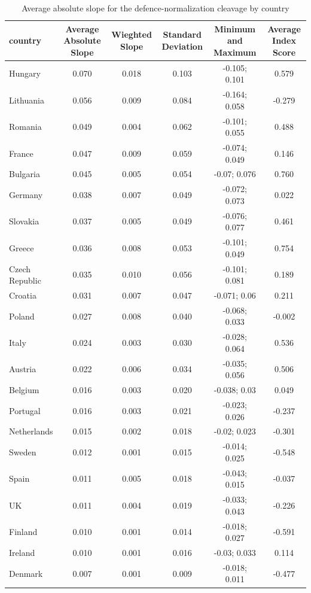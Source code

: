\begin{table}

\caption{Average absolute slope for the defence-normalization cleavage by country\label{tab:average_slopes} }
\centering
\begin{tabular}[t]{lccccc}
\toprule
country & Average Absolute Slope & Wieghted Slope & Standard Deviation & Minimum and Maximum & Average Index Score\\
\midrule
Hungary & 0.070 & 0.018 & 0.103 & -0.105; 0.101 & 0.579\\
Lithuania & 0.056 & 0.009 & 0.084 & -0.164; 0.058 & -0.279\\
Romania & 0.049 & 0.004 & 0.062 & -0.101; 0.055 & 0.488\\
France & 0.047 & 0.009 & 0.059 & -0.074; 0.049 & 0.146\\
Bulgaria & 0.045 & 0.005 & 0.054 & -0.07; 0.076 & 0.760\\
Germany & 0.038 & 0.007 & 0.049 & -0.072; 0.073 & 0.022\\
Slovakia & 0.037 & 0.005 & 0.049 & -0.076; 0.077 & 0.461\\
Greece & 0.036 & 0.008 & 0.053 & -0.101; 0.049 & 0.754\\
Czech Republic & 0.035 & 0.010 & 0.056 & -0.101; 0.081 & 0.189\\
Croatia & 0.031 & 0.007 & 0.047 & -0.071; 0.06 & 0.211\\
Poland & 0.027 & 0.008 & 0.040 & -0.068; 0.033 & -0.002\\
Italy & 0.024 & 0.003 & 0.030 & -0.028; 0.064 & 0.536\\
Austria & 0.022 & 0.006 & 0.034 & -0.035; 0.056 & 0.506\\
Belgium & 0.016 & 0.003 & 0.020 & -0.038; 0.03 & 0.049\\
Portugal & 0.016 & 0.003 & 0.021 & -0.023; 0.026 & -0.237\\
Netherlands & 0.015 & 0.002 & 0.018 & -0.02; 0.023 & -0.301\\
Sweden & 0.012 & 0.001 & 0.015 & -0.014; 0.025 & -0.548\\
Spain & 0.011 & 0.005 & 0.018 & -0.043; 0.015 & -0.037\\
UK & 0.011 & 0.004 & 0.019 & -0.033; 0.043 & -0.226\\
Finland & 0.010 & 0.001 & 0.014 & -0.018; 0.027 & -0.591\\
Ireland & 0.010 & 0.001 & 0.016 & -0.03; 0.033 & 0.114\\
Denmark & 0.007 & 0.001 & 0.009 & -0.018; 0.011 & -0.477\\
\bottomrule
\end{tabular}
\end{table}
